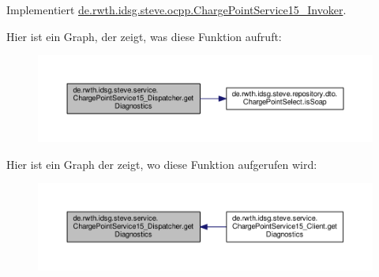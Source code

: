 Implementiert \hyperlink{interfacede_1_1rwth_1_1idsg_1_1steve_1_1ocpp_1_1_charge_point_service15___invoker_afdb853e250b6930a583b4729cfcf5a6d}{de.\-rwth.\-idsg.\-steve.\-ocpp.\-Charge\-Point\-Service15\-\_\-\-Invoker}.



Hier ist ein Graph, der zeigt, was diese Funktion aufruft\-:\nopagebreak
\begin{figure}[H]
\begin{center}
\leavevmode
\includegraphics[width=350pt]{classde_1_1rwth_1_1idsg_1_1steve_1_1service_1_1_charge_point_service15___dispatcher_a33ff8d7a94169e8083f45980b22a4c4b_cgraph}
\end{center}
\end{figure}




Hier ist ein Graph der zeigt, wo diese Funktion aufgerufen wird\-:\nopagebreak
\begin{figure}[H]
\begin{center}
\leavevmode
\includegraphics[width=350pt]{classde_1_1rwth_1_1idsg_1_1steve_1_1service_1_1_charge_point_service15___dispatcher_a33ff8d7a94169e8083f45980b22a4c4b_icgraph}
\end{center}
\end{figure}


